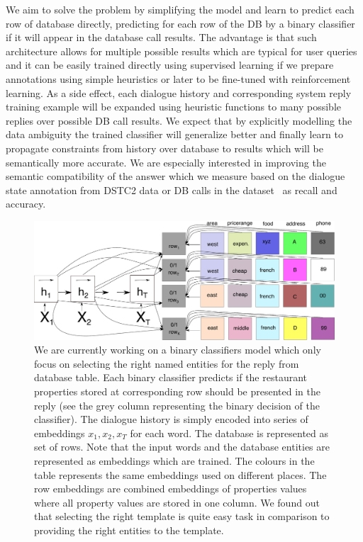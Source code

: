 \documentclass[11pt]{article}
\begin{document}
We aim to solve the problem by simplifying the model and learn to predict each row of database directly, predicting for each row of the DB by a binary classifier if it will appear in the database call results. 
The advantage is that such architecture allows for multiple possible results which are typical for user queries and it can be easily trained directly using supervised learning if we prepare annotations using simple heuristics or later to be fine-tuned with reinforcement learning.
As a side effect, each dialogue history and corresponding system reply training example will be expanded using heuristic functions to many possible replies over possible DB call results.
We expect that by explicitly modelling the data ambiguity the trained classifier will generalize better and finally learn to propagate constraints from history over database to results which will be semantically more accurate.
We are especially interested in improving the semantic compatibility of the answer which we measure based on the dialogue state annotation from DSTC2 data or DB calls in the dataset~\cite{platek2016wochat} as recall and accuracy.
\begin{figure}[ht]
    \centering
    \includegraphics[width=1.0\linewidth]{e2end_dbclassifiers}
    \caption{We are currently working on a binary classifiers model which only focus on selecting the right named entities for the reply from database table. 
    Each binary classifier predicts if the restaurant properties stored at corresponding row should be presented in the reply (see the grey column representing the binary decision of the classifier). 
    The dialogue history is simply encoded into series of embeddings $x_1, x_2, x_T$ for each word.
    The database is represented as set of rows.
    Note that the input words and the database entities are represented as embeddings which are trained. 
    The colours in the table represents the same embeddings used on different places.
    The row embeddings are combined embeddings of properties values where all property values are stored in one column.
    We found out that selecting the right template is quite easy task in comparison to providing the right entities to the template.
    }
\label{fig:e2end_entities}
\end{figure}
\end{document}
